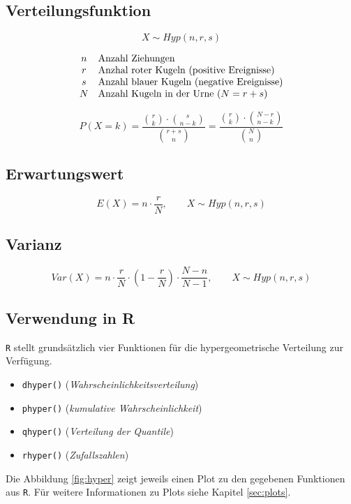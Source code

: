 \subsection{Verteilungsfunktion}
\[  
	X \sim Hyp(n,r,s)
\]

\[ \begin{array}{c l}
	n & \text{Anzahl Ziehungen} \\
	r & \text{Anzhal roter Kugeln (positive Ereignisse)} \\
	s & \text{Anzahl blauer Kugeln (negative Ereignisse)} \\
	N & \text{Anzahl Kugeln in der Urne } (N=r+s)
\end{array} \]

\[
	P(X=k)
		= \frac{\displaystyle 
			\binom{r}{k} \cdot \binom{s}{n-k}}{
				\displaystyle \binom{r+s}{n}}
		= \frac{\displaystyle 
			\binom{r}{k} \cdot \binom{N-r}{n-k}}{
				\displaystyle \binom{N}{n}}
\]

\subsection{Erwartungswert}

\[ 
	E(X) = n \cdot \frac{r}{N}, \qquad X \sim Hyp(n,r,s)
\]

\subsection{Varianz}

\[  
	Var(X) = n \cdot \frac{r}{N} \cdot 
		\left(1 - \frac{r}{N} \right)
		\cdot \frac{N-n}{N-1}, \qquad X \sim Hyp(n,r,s)
\]

\subsection{Verwendung in R}
\lstinline{R} stellt grundsätzlich vier Funktionen für die 
hypergeometrische Verteilung zur Verfügung. 
\begin{itemize}
	\item \lstinline{dhyper()} \hfill{} 
		(\emph{Wahrscheinlichkeitsverteilung})
	\item \lstinline{phyper()} \hfill{}
		(\emph{kumulative Wahrscheinlichkeit})
	\item \lstinline{qhyper()} \hfill{}
		(\emph{Verteilung der Quantile})
	\item \lstinline{rhyper()} \hfill{}
		(\emph{Zufallszahlen})
\end{itemize}
Die Abbildung \ref{fig:hyper} zeigt jeweils einen Plot zu den gegebenen
Funktionen aus \lstinline{R}. Für weitere Informationen zu Plots siehe
Kapitel \ref{sec:plots}.





